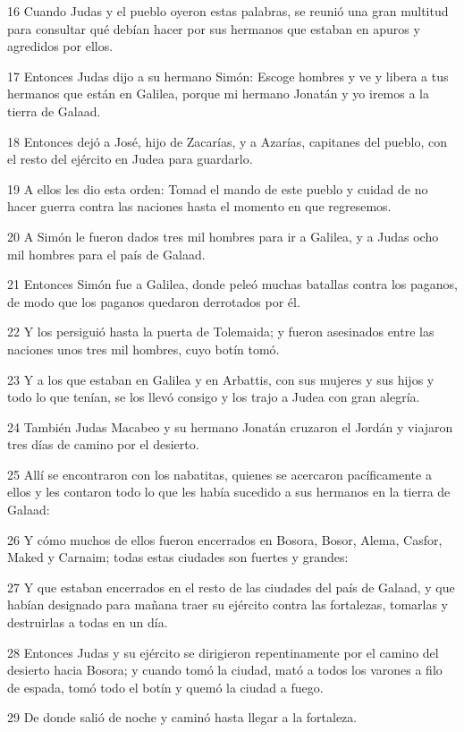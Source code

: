 \par 16 Cuando Judas y el pueblo oyeron estas palabras, se reunió una gran multitud para consultar qué debían hacer por sus hermanos que estaban en apuros y agredidos por ellos.
\par 17 Entonces Judas dijo a su hermano Simón: Escoge hombres y ve y libera a tus hermanos que están en Galilea, porque mi hermano Jonatán y yo iremos a la tierra de Galaad.
\par 18 Entonces dejó a José, hijo de Zacarías, y a Azarías, capitanes del pueblo, con el resto del ejército en Judea para guardarlo.
\par 19 A ellos les dio esta orden: Tomad el mando de este pueblo y cuidad de no hacer guerra contra las naciones hasta el momento en que regresemos.
\par 20 A Simón le fueron dados tres mil hombres para ir a Galilea, y a Judas ocho mil hombres para el país de Galaad.
\par 21 Entonces Simón fue a Galilea, donde peleó muchas batallas contra los paganos, de modo que los paganos quedaron derrotados por él.
\par 22 Y los persiguió hasta la puerta de Tolemaida; y fueron asesinados entre las naciones unos tres mil hombres, cuyo botín tomó.
\par 23 Y a los que estaban en Galilea y en Arbattis, con sus mujeres y sus hijos y todo lo que tenían, se los llevó consigo y los trajo a Judea con gran alegría.
\par 24 También Judas Macabeo y su hermano Jonatán cruzaron el Jordán y viajaron tres días de camino por el desierto.
\par 25 Allí se encontraron con los nabatitas, quienes se acercaron pacíficamente a ellos y les contaron todo lo que les había sucedido a sus hermanos en la tierra de Galaad:
\par 26 Y cómo muchos de ellos fueron encerrados en Bosora, Bosor, Alema, Casfor, Maked y Carnaim; todas estas ciudades son fuertes y grandes:
\par 27 Y que estaban encerrados en el resto de las ciudades del país de Galaad, y que habían designado para mañana traer su ejército contra las fortalezas, tomarlas y destruirlas a todas en un día.
\par 28 Entonces Judas y su ejército se dirigieron repentinamente por el camino del desierto hacia Bosora; y cuando tomó la ciudad, mató a todos los varones a filo de espada, tomó todo el botín y quemó la ciudad a fuego.
\par 29 De donde salió de noche y caminó hasta llegar a la fortaleza.

